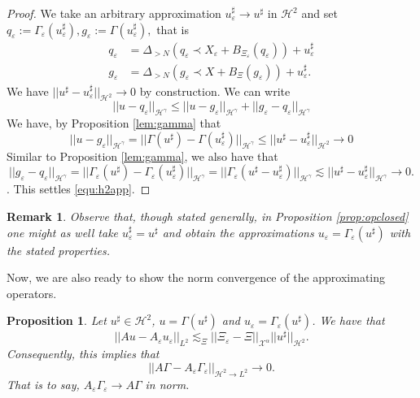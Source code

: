 \documentclass[11pt, oneside]{article}   	%
\newtheorem{proposition}[theorem]{Proposition}
\newtheorem{remark}[theorem]{Remark}
\begin{document}
\begin{proof}

	 We take an arbitrary approximation $u_\varepsilon^\sharp \rightarrow u^\sharp$ in $\mathscr{H}^2$ and set $q_\varepsilon := \Gamma_\varepsilon (u_\varepsilon^\sharp), g_\varepsilon := \Gamma(u_\varepsilon^\sharp), $   that is
	\begin{align*}
	q_\varepsilon &=\Delta_{> N}(q_\varepsilon\prec X_\varepsilon +B_{\Xi_\varepsilon}(q_\varepsilon))+u_\varepsilon^\sharp\\
	g_\varepsilon &=\Delta_{> N}(g_\varepsilon\prec X +B_{\Xi}(g_\varepsilon))+u_\varepsilon^\sharp.
	\end{align*}
	We have $|| u^\sharp - u_\varepsilon^\sharp ||_{\mathscr{H}^2} \rightarrow 0$ by construction.  We can write
	\[
	|| u - q_\varepsilon  ||_{\mathscr{H}^\gamma} \leq || u - g_\varepsilon  ||_{\mathscr{H}^\gamma} + || g_\varepsilon  - q_\varepsilon  ||_{\mathscr{H}^\gamma} 
	\]
	We have, by Proposition \ref{lem:gamma} that
	\[
	|| u - g_\varepsilon  ||_{\mathscr{H}^\gamma} = || \Gamma(u^\sharp) - \Gamma(u_\varepsilon^\sharp)  ||_{\mathscr{H}^\gamma}\leq || u^\sharp - u_\varepsilon^\sharp ||_{\mathscr{H}^2} \rightarrow 0
	\]
	Similar to Proposition \ref{lem:gamma}, we also have that
	\[|| g_\varepsilon  - q_\varepsilon  ||_{\mathscr{H}^\gamma}  = || \Gamma_\varepsilon(u^\sharp) - \Gamma_\varepsilon(u_\varepsilon^\sharp)  ||_{\mathscr{H}^\gamma} = || \Gamma_\varepsilon(u^\sharp- u_\varepsilon^\sharp)  ||_{\mathscr{H}^\gamma} \lesssim || u^\sharp- u_\varepsilon^\sharp  ||_{\mathscr{H}^\gamma} \rightarrow 0. \].  This settles \eqref{equ:h2app}.
	
\end{proof}

\begin{remark}\upshape
Observe that, though stated generally, in Proposition \ref{prop:opclosed} one might as well take $u_\varepsilon^\sharp = u^\sharp$ and obtain the approximations $u_\varepsilon = \Gamma_\varepsilon(u^\sharp)$ with the stated properties.
\end{remark}



Now, we are also ready to show the norm convergence of the approximating operators.

\begin{proposition} \label{prop:opApp}
	Let  $u^\sharp \in \mathscr{H}^2$, $u  = \Gamma(u^\sharp )$ and  $u_\varepsilon  = \Gamma_\varepsilon(u^\sharp )$. We have that
	\begin{equation}\label{equ:normOpConv2}
	|| Au - A_\varepsilon u_\varepsilon ||_{L^2} \lesssim_{\Xi}   || \Xi_\varepsilon - \Xi||_{\mathscr{X}^\alpha} ||u^\sharp||_{\mathscr{H}^2}.
	\end{equation}
	Consequently, this implies that
	\begin{equation} \label{equ:normOpConv3}
	|| A\Gamma - A_\varepsilon \Gamma_\varepsilon   ||_{\mathscr{H}^2 \rightarrow L^2}  \rightarrow 0.
	\end{equation}
	That is to say, $A_\varepsilon \Gamma_\varepsilon \rightarrow A\Gamma$ in norm.
	\end{proposition}
\end{document}
